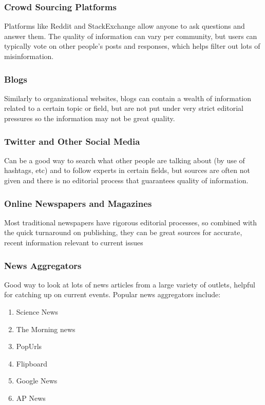 \documentclass{report}
\begin{document}
            \subsubsection{Crowd Sourcing Platforms}
                Platforms like Reddit and StackExchange allow anyone to ask questions and answer them. The quality of information can vary per community, but users can typically vote on other people's posts and responses, which helps filter out lots of misinformation.

            \subsubsection{Blogs}
                Similarly to organizational websites, blogs can contain a wealth of information related to a certain topic or field, but are not put under very strict editorial pressures so the information may not be great quality.

            \subsubsection{Twitter and Other Social Media}
                Can be a good way to search what other people are talking about (by use of hashtags, etc) and to follow experts in certain fields, but sources are often not given and there is no editorial process that guarantees quality of information. 

            \subsubsection{Online Newspapers and Magazines}
                Most traditional newspapers have rigorous editorial processes, so combined with the quick  turnaround on publishing, they can be great sources for accurate, recent information relevant to current issues

            \subsubsection{News Aggregators}
                Good way to look at lots of news articles from a large variety of outlets, helpful for catching up on current events. Popular news aggregators include:
                \begin{enumerate}
                    \item Science News
                    \item The Morning news
                    \item PopUrls
                    \item Flipboard
                    \item Google News
                    \item AP News
                \end{enumerate}
\end{document}
